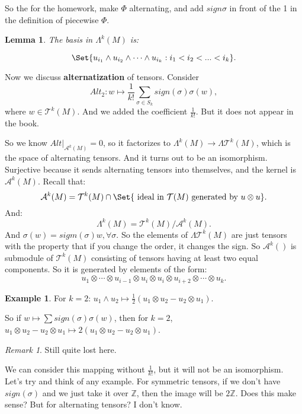 \documentclass[9pt,reqno,twoside]{amsbook}
\theoremstyle{plain}
\numberwithin{section}{chapter}
\numberwithin{equation}{chapter}
\newtheorem{lem}[theorem]{Lemma}
\theoremstyle{definition}
\newtheorem{Ex}[theorem]{Example}
\theoremstyle{remark}
\newtheorem{rem}[theorem]{Remark}
\theoremstyle{plain}
\newcommand{\z}{\mathbb{Z}}
\newcommand{\bb}{\vspace{3mm}}
\newcommand{\mc}{\mathcal}
\newcommand{\fracc}{\frac}
\newcommand{\tens}{\otimes}
\newcommand{\Tau}{\mc{T}}
\begin{document}
So the for the homework, make $\Phi$ alternating, and add $sign \sigma$ in front of the 1 in the definition of piecewise $\Phi$. 

\begin{lem}
 The basis in $\Lambda^k(M)$ is:
 
 $$
 \Set{u_{i_1} \wedge u_{i_2} \wedge \cdots \wedge u_{i_k}: i_1 < i_2 < ... < i_k}.
 $$
\end{lem}


\bb\bb

Now we discuss \textbf{alternatization} of tensors. Consider 
$$
Alt_2:w \mapsto \fracc{1}{k!}\sum_{\sigma \in S_k}sign(\sigma) \sigma(w),
$$ 
where $w \in \mc{T}^k(M)$. And we added the coefficient $\fracc{1}{k!}$. But it does not appear in the book. 

So we know $Alt|_{\mc{A}^k(M)} = 0$, so it factorizes to $\Lambda^k(M) \to \Lambda\mc{T}^k(M)$, which is the space of alternating tensors. And it turns out to be an isomorphism. Surjective because it sends alternating tensors into themselves, and the kernel is $\mc{A}^k(M)$. Recall that:
$$
\mc{A}^k(M) = \Tau^k(M) \cap \Set{\text{ ideal in }\Tau(M) \text{ generated by }u \tens u}.
$$
And:
$$
\Lambda^k(M) = \Tau^k(M)/\mc{A}^k(M).
$$
And $\sigma(w) = sigm(\sigma)w, \forall \sigma$. So the elements of $\Lambda\Tau^k(M)$ are just tensors with the property that if you change the order, it changes the sign. So $\mc{A}^k()$ is submodule of $\Tau^k(M)$ consisting of tensors having at least two equal components. So it is generated by elements of the form:
$$
u_1 \tens \cdots \tens u_{i - 1} \tens u_i \tens u_i \tens u_{i + 2} \tens \cdots \tens u_k.
$$

\begin{Ex}
For $k = 2$: $u_1 \wedge u_2 \mapsto \fracc{1}{2}(u_1 \tens u_2 - u_2 \tens u_1)$. 
\end{Ex}

So if $w \mapsto \sum sign(\sigma)\sigma(w)$, then for $k = 2$, $u_1 \tens u_2 - u_2 \tens u_1 \mapsto 2(u_1 \tens u_2 - u_2 \tens u_1)$. 

\begin{rem}
Still quite lost here. 
\end{rem}

We can consider this mapping without $\fracc{1}{k!}$, but it will not be an isomorphism. Let's try and think of any example. For symmetric tensors, if we don't have $sign(\sigma)$ and we just take it over $\z$, then the image will be $2\z$. Does this make sense? But for alternating tensors? I don't know. 
\end{document}
